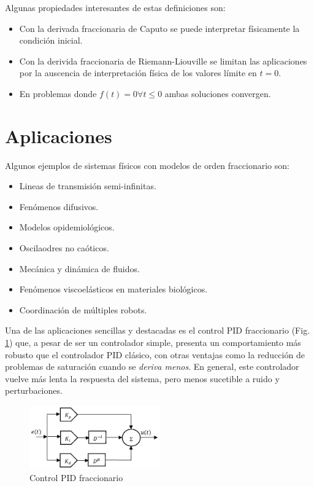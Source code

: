 \documentclass[conference]{IEEEtran}
\begin{document}
Algunas propiedades interesantes de estas definiciones son:
\begin{itemize}
    \item Con la derivada fraccionaria de Caputo se puede interpretar físicamente la condición inicial.
    \item Con la derivida fraccionaria de Riemann-Liouville se limitan las aplicaciones por la auscencia de interpretación física de los valores límite en $t=0$.
    \item En problemas donde $f(t) = 0 \forall t \leq 0$ ambas soluciones convergen.
\end{itemize}

\section{Aplicaciones}\label{AA}
Algunos ejemplos de sistemas físicos con modelos de orden fraccionario son:
\begin{itemize}
    \item Lineas de transmisión semi-infinitas.
    \item Fenómenos difusivos.
    \item Modelos opidemiológicos.
    \item Oscilaodres no caóticos.
    \item Mecánica y dinámica de fluidos.
    \item Fenómenos viscoelásticos en materiales biológicos.
    \item Coordinación de múltiples robots.
\end{itemize}

Una de las aplicaciones sencillas y destacadas es el control PID fraccionario (Fig. \ref{fig:frac-pid}) que, a pesar de ser un controlador simple, presenta un comportamiento más robusto que el controlador PID clásico, con otras ventajas como la reducción de problemas de saturación cuando se \textit{deriva menos}. En general, este controlador vuelve más lenta la respuesta del sistema, pero menos sucetible a ruido y perturbaciones.

\begin{figure}[h]
    \centering
    \includegraphics[width=0.5\textwidth]{fractional-pid.jpg}
    \caption{Control PID fraccionario}
    \label{fig:frac-pid}
\end{figure}
\end{document}
